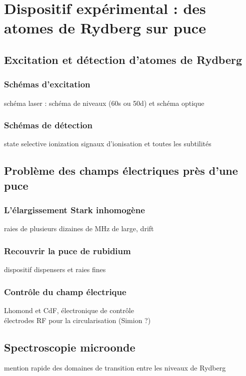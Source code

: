 \chapter{Dispositif expérimental : des atomes de Rydberg sur puce}
\label{chapter:setup_ryd}

\section{Excitation et détection d'atomes de Rydberg}
	\subsection*{Schémas d'excitation}
		\noindent schéma laser : schéma de niveaux (60s ou 50d) et schéma optique		
	\subsection*{Schémas de détection}
		\noindent state selective ionization
		\noindent signaux d'ionisation et toutes les subtilités
		
\section{Problème des champs électriques près d'une puce}
	\subsection*{L'élargissement Stark inhomogène}
		\noindent raies de plusieurs dizaines de MHz de large, drift
	\subsection*{Recouvrir la puce de rubidium}
		\noindent dispositif dispensers et raies fines
	\subsection*{Contrôle du champ électrique}
		\noindent Lhomond et CdF, électronique de contrôle \\
		\noindent électrodes RF pour la circularisation (Simion ?) 
		
\section{Spectroscopie microonde}
	\noindent mention rapide des domaines de transition entre les niveaux de Rydberg